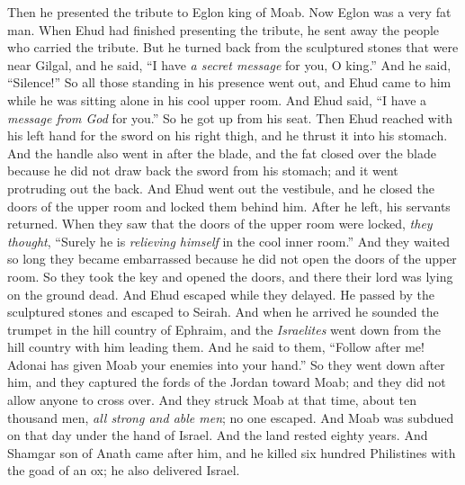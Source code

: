 \begin{biblechapter}
\verse Then he presented the tribute to Eglon king of Moab. Now Eglon was a very fat man.
\verse When Ehud had finished presenting the tribute, he sent away the people who carried the tribute.
\verse But he turned back from the sculptured stones that were near Gilgal, and he said, “I have \textit{a secret message} for you, O king.” And he said, “Silence!” So all those standing in his presence went out,
\verse and Ehud came to him while he was sitting alone in his cool upper room. And Ehud said, “I have a \textit{message from God} for you.” So he got up from his seat.
\verse Then Ehud reached with his left hand for the sword on his right thigh, and he thrust it into his stomach.
\verse And the handle also went in after the blade, and the fat closed over the blade because he did not draw back the sword from his stomach; and it went protruding out the back.
\verse And Ehud went out the vestibule, and he closed the doors of the upper room and locked them behind him.
\verse After he left, his servants returned. When they saw that the doors of the upper room were locked, \textit{they thought}, “Surely he is \textit{relieving himself} in the cool inner room.”
\verse And they waited so long they became embarrassed because he did not open the doors of the upper room. So they took the key and opened the doors, and there their lord was lying on the ground dead.
\verse And Ehud escaped while they delayed. He passed by the sculptured stones and escaped to Seirah.
\verse And when he arrived he sounded the trumpet in the hill country of Ephraim, and the \textit{Israelites} went down from the hill country with him leading them.
\verse And he said to them, “Follow after me! Adonai has given Moab your enemies into your hand.” So they went down after him, and they captured the fords of the Jordan toward Moab; and they did not allow anyone to cross over.
\verse And they struck Moab at that time, about ten thousand men, \textit{all strong and able men}; no one escaped.
\verse And Moab was subdued on that day under the hand of Israel. And the land rested eighty years.
 And Shamgar son of Anath came after him, and he killed six hundred Philistines with the goad of an ox; he also delivered Israel.
\end{biblechapter}

